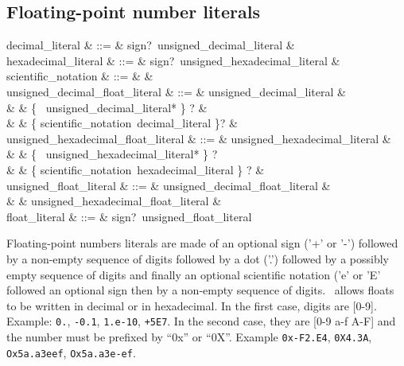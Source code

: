 \subsection{Floating-point number literals}
\begin{syntax}
decimal\_literal & ::= & sign?\ unsigned\_decimal\_literal & \\
hexadecimal\_literal & ::= & sign?\ unsigned\_hexadecimal\_literal & \\
scientific\_notation & ::= &  \mid {} & \\
unsigned\_decimal\_float\_literal & ::= & unsigned\_decimal\_literal & \\
& &  \{ \ unsigned\_decimal\_literal* \} ? & \\
& &  \{ scientific\_notation\ decimal\_literal \}? & \\
unsigned\_hexadecimal\_float\_literal & ::= & unsigned\_hexadecimal\_literal &\\
& & \{ \ unsigned\_hexadecimal\_literal* \} ? \\
& & \{ scientific\_notation\ hexadecimal\_literal \} ? & \\
unsigned\_float\_literal & ::= & unsigned\_decimal\_float\_literal & \\
& & \mid unsigned\_hexadecimal\_float\_literal & \\
float\_literal & ::= & sign?\ unsigned\_float\_literal
\end{syntax}

Floating-point numbers literals are made of an optional sign ('+' or
'-') followed by a non-empty sequence of digits followed by a dot
('.') followed by a possibly empty sequence of digits and finally an
optional scientific notation ('e' or 'E' followed an optional sign
then by a non-empty sequence of digits. \focal\ allows floats to be
written in decimal or in hexadecimal. In the first case, digits are
[0-9]. Example: {\tt 0.}, {\tt -0.1}, {\tt 1.e-10}, {\tt +5E7}.
In the second case, they are [0-9 a-f A-F] and the number must be
prefixed by ``0x'' or ``0X''. Example {\tt 0x-F2.E4}, {\tt 0X4.3A},
{\tt Ox5a.a3eef}, {\tt Ox5a.a3e-ef}.



